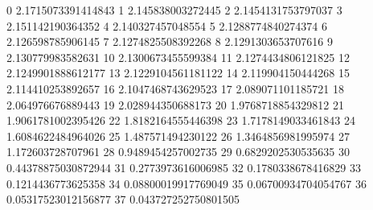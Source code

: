 0 2.1715073391414843
1 2.145838003272445
2 2.1454131753797037
3 2.151142190364352
4 2.140327457048554
5 2.1288774840274374
6 2.126598785906145
7 2.1274825508392268
8 2.1291303653707616
9 2.130779983582631
10 2.1300673455599384
11 2.1274434806121825
12 2.1249901888612177
13 2.1229104561181122
14 2.119904150444268
15 2.114410253892657
16 2.1047468743629523
17 2.089071101185721
18 2.064976676889443
19 2.028944350688173
20 1.9768718854329812
21 1.9061781002395426
22 1.8182164555446398
23 1.7178149033461843
24 1.6084622484964026
25 1.487571494230122
26 1.3464856981995974
27 1.172603728707961
28 0.9489454257002735
29 0.6829202530535635
30 0.44378875030872944
31 0.2773973616006985
32 0.1780338678416829
33 0.1214436773625358
34 0.08800019917769049
35 0.06700934704054767
36 0.05317523012156877
37 0.043727252750801505
